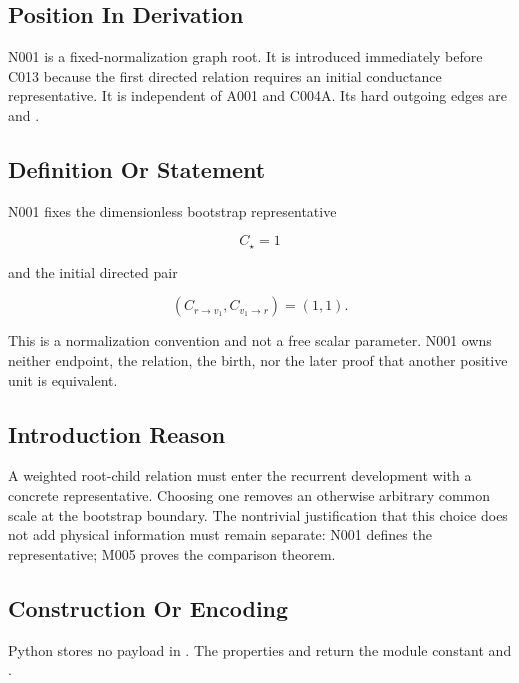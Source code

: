 \subsection{Position In Derivation}\label{position-in-derivation-6}

N001 is a fixed-normalization graph root. It is introduced immediately
before C013 because the first directed relation requires an initial
conductance representative. It is independent of A001 and C004A. Its
hard outgoing edges are \texttt{\protect{}} and
\texttt{\protect{}}.

\subsection{Definition Or Statement}\label{definition-or-statement-4}

N001 fixes the dimensionless bootstrap representative

\[
C_\star=1
\]

and the initial directed pair

\[
(C_{r\to v_1},C_{v_1\to r})=(1,1).
\]

This is a normalization convention and not a free scalar parameter. N001
owns neither endpoint, the relation, the birth, nor the later proof that
another positive unit is equivalent.

\subsection{Introduction Reason}\label{introduction-reason-9}

A weighted root-child relation must enter the recurrent development with
a concrete representative. Choosing one removes an otherwise arbitrary
common scale at the bootstrap boundary. The nontrivial justification
that this choice does not add physical information must remain separate:
N001 defines the representative; M005 proves the comparison theorem.

\subsection{Construction Or Encoding}\label{construction-or-encoding-4}

Python stores no payload in \texttt{\protect{}}.
The properties \texttt{\protect{}} and \texttt{\protect{}} return the
module constant \texttt{\protect{}} and \texttt{\protect{}}.

